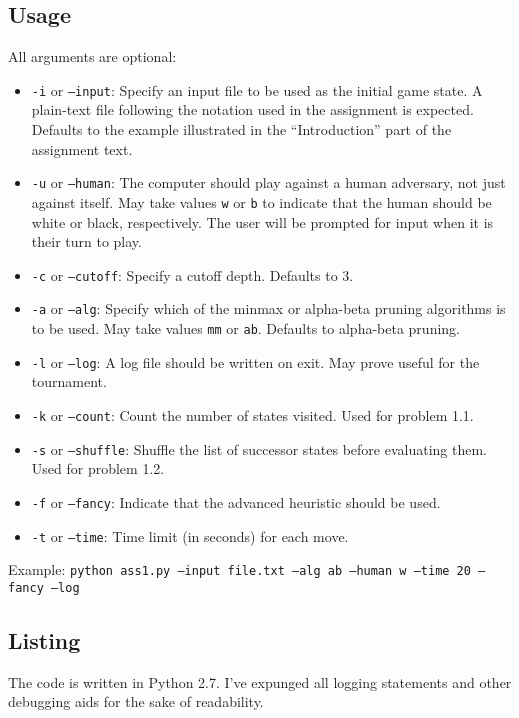 \documentclass[letterpaper, 11pt]{article}
\numberwithin{theorem}{section}
\begin{document}
\subsection{Usage}
All arguments are optional:
\begin{itemize}
	\item \texttt{-i} or \texttt{--input}: Specify an input file to be used as the initial game state. A plain-text file following the notation used in the assignment is expected. Defaults to the example illustrated in the ``Introduction'' part of the assignment text.
	\item \texttt{-u} or \texttt{--human}: The computer should play against a human adversary, not just against itself. May take values \texttt{w} or \texttt{b} to indicate that the human should be white or black, respectively. The user will be prompted for input when it is their turn to play.
	\item \texttt{-c} or \texttt{--cutoff}: Specify a cutoff depth. Defaults to 3.
	\item \texttt{-a} or \texttt{--alg}: Specify which of the minmax or alpha-beta pruning algorithms is to be used. May take values \texttt{mm} or \texttt{ab}. Defaults to alpha-beta pruning.
	\item \texttt{-l} or \texttt{--log}: A log file should be written on exit. May prove useful for the tournament.
	\item \texttt{-k} or \texttt{--count}: Count the number of states visited. Used for problem 1.1.
	\item \texttt{-s} or \texttt{--shuffle}: Shuffle the list of successor states before evaluating them. Used for problem 1.2.
	\item \texttt{-f} or \texttt{--fancy}: Indicate that the advanced heuristic should be used. 
	\item \texttt{-t} or \texttt{--time}: Time limit (in seconds) for each move.
\end{itemize}
Example: \texttt{python ass1.py --input file.txt --alg ab --human w --time 20 --fancy --log}

\subsection{Listing}
The code is written in Python 2.7. I've expunged all logging statements and other debugging aids for the sake of readability. 

\end{document}
